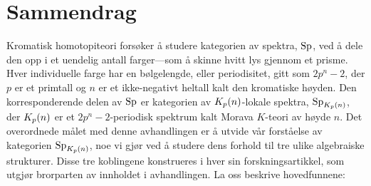 




\cleardoublepage
\section*{Sammendrag}

Kromatisk homotopiteori forsøker å studere kategorien av spektra, $\mathrm{Sp}$, ved å dele den opp i et uendelig antall farger---som å skinne hvitt lys gjennom et prisme. Hver individuelle farge har en bølgelengde, eller periodisitet, gitt som $2p^n-2$, der $p$ er et primtall og $n$ er et ikke-negativt heltall kalt den kromatiske høyden. Den korresponderende delen av $\mathrm{Sp}$ er kategorien av ${K_p(n)}$-lokale spektra, $\mathrm{Sp}_{K_p(n)}$, der ${K_p(n)}$ er et $2p^n-2$-periodisk spektrum kalt Morava $K$-teori av høyde $n$. Det overordnede målet med denne avhandlingen er å utvide vår forståelse av kategorien $\mathrm{Sp}_{K_p(n)}$, noe vi gjør ved å studere dens forhold til tre ulike algebraiske strukturer. Disse tre koblingene konstrueres i hver sin forskningsartikkel, som utgjør brorparten av innholdet i avhandlingen. La oss beskrive hovedfunnene: 

